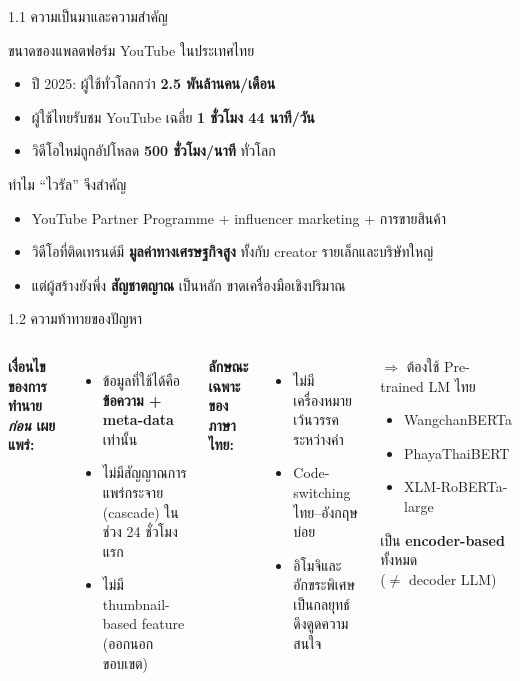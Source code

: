 \documentclass[aspectratio=169,11pt,xcolor=dvipsnames]{beamer}
\newcommand{\hl}[1]{\textcolor{kmitlOrange}{\textbf{#1}}}
\begin{document}
\begin{frame}{1.1 ความเป็นมาและความสำคัญ}
  \begin{block}{ขนาดของแพลตฟอร์ม YouTube ในประเทศไทย}
    \begin{itemize}
      \item ปี 2025: ผู้ใช้ทั่วโลกกว่า \hl{2.5 พันล้านคน/เดือน}
      \item ผู้ใช้ไทยรับชม YouTube เฉลี่ย \hl{1 ชั่วโมง 44 นาที/วัน}
      \item วิดีโอใหม่ถูกอัปโหลด \hl{500 ชั่วโมง/นาที} ทั่วโลก
    \end{itemize}
  \end{block}
  \begin{block}{ทำไม ``ไวรัล'' จึงสำคัญ}
    \begin{itemize}
      \item YouTube Partner Programme + influencer marketing + การขายสินค้า
      \item วิดีโอที่ติดเทรนด์มี \hl{มูลค่าทางเศรษฐกิจสูง} ทั้งกับ creator รายเล็กและบริษัทใหญ่
      \item แต่ผู้สร้างยังพึ่ง \hl{สัญชาตญาณ} เป็นหลัก ขาดเครื่องมือเชิงปริมาณ
    \end{itemize}
  \end{block}
\end{frame}

\begin{frame}{1.2 ความท้าทายของปัญหา}
  \begin{columns}[T]
    \textbf{เงื่อนไขของการทำนาย \textit{ก่อน} เผยแพร่:}
    \begin{itemize}
      \item ข้อมูลที่ใช้ได้คือ \hl{ข้อความ + meta-data} เท่านั้น
      \item ไม่มีสัญญาณการแพร่กระจาย (cascade) ในช่วง 24 ชั่วโมงแรก
      \item ไม่มี thumbnail-based feature (ออกนอกขอบเขต)
    \end{itemize}
    \vspace{0.4em}
    \textbf{ลักษณะเฉพาะของภาษาไทย:}
    \begin{itemize}
      \item ไม่มีเครื่องหมายเว้นวรรคระหว่างคำ
      \item Code-switching ไทย--อังกฤษบ่อย
      \item อิโมจิและอักขระพิเศษเป็นกลยุทธ์ดึงดูดความสนใจ
    \end{itemize}
    \begin{block}{$\Rightarrow$ ต้องใช้ Pre-trained LM ไทย}
      \begin{itemize}
        \item WangchanBERTa
        \item PhayaThaiBERT
        \item XLM-RoBERTa-large
      \end{itemize}
      เป็น \hl{encoder-based} ทั้งหมด\\
      ($\neq$ decoder LLM)
    \end{block}
  \end{columns}
\end{frame}
\end{document}
